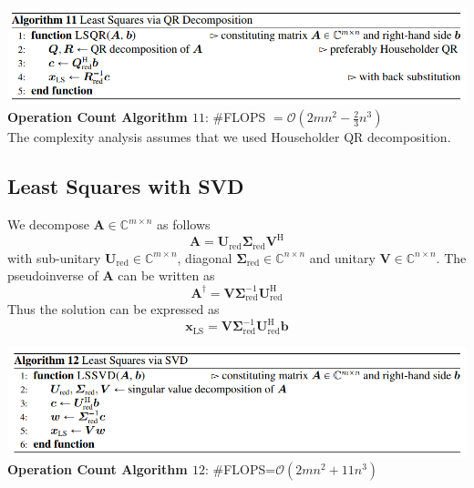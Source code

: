 \documentclass[english]{latex4ei/latex4ei_sheet}
\begin{document}
\begin{sectionbox}
\includegraphics[width=\textwidth]{img/algo11_ls_with_QR.PNG}\\
\textbf{Operation Count Algorithm $11$}: \#FLOPS $=\mathcal{O}(2mn^2-\frac{2}{3}n^3)$\\
The complexity analysis assumes that we used Householder QR decomposition.
\end{sectionbox}
\begin{sectionbox}
\subsection{Least Squares with SVD}
We decompose $\mathbf{A}\in\mathbb{C}^{m\times n}$ as follows
$$\mathbf{A}=\mathbf{U}_{\text{red}}\mathbf{\Sigma}_{\text{red}}\mathbf{V}^\text{H}$$
with sub-unitary $\mathbf{U}_{\text{red}}\in\mathbb{C}^{m\times n}$, diagonal $\mathbf{\Sigma}_{\text{red}} \in\mathbb{C}^{n\times n}$ and unitary $\mathbf{V} \in\mathbb{C}^{n\times n}$. The pseudoinverse of $\mathbf{A}$ can be written as
$$\mathbf{A}^\dagger = \mathbf{V}\mathbf{\Sigma}^{-1}_{\text{red}}\mathbf{U}^\text{H}_{\text{red}}$$
Thus the solution can be expressed as
$$\mathbf{x}_{\text{LS}} = \mathbf{V}\mathbf{\Sigma}^{-1}_{\text{red}}\mathbf{U}^\text{H}_{\text{red}}\mathbf{b}$$

\end{sectionbox}
\begin{sectionbox}
\includegraphics[width=\textwidth]{img/algo12_ls_with_SVD.PNG}\\
\textbf{Operation Count Algorithm $12$}: \#FLOPS=$\mathcal{O}(2mn^2+11n^3)$
\end{sectionbox}
\end{document}
